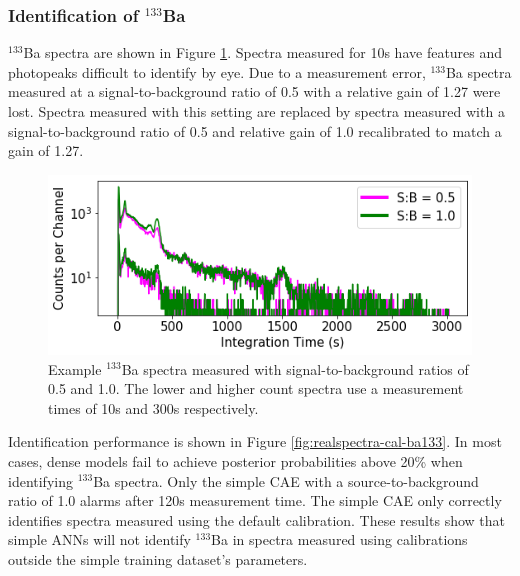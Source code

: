 \subsubsection{Identification of $^{133}$Ba}

$^{133}$Ba spectra are shown in Figure \ref{fig:realspectra-cal-ba133-spec}. Spectra measured for 10s have features and photopeaks difficult to identify by eye. Due to a measurement error, $^{133}$Ba spectra measured at a signal-to-background ratio of 0.5 with a relative gain of 1.27 were lost. Spectra measured with this setting are replaced by spectra measured with a signal-to-background ratio of 0.5 and relative gain of 1.0 recalibrated to match a gain of 1.27.

\begin{figure}[H]
	\centering
	\includegraphics[width=0.85\linewidth]{images/realspectra-cal-ba133-spec}
	\caption{Example $^{133}$Ba spectra measured with signal-to-background ratios of 0.5 and 1.0. The lower and higher count spectra use a measurement times of 10s and 300s respectively.}
	\label{fig:realspectra-cal-ba133-spec}
\end{figure}

Identification performance is shown in Figure \ref{fig:realspectra-cal-ba133}. In most cases, dense models fail to achieve posterior probabilities above 20\% when identifying $^{133}$Ba spectra. Only the simple CAE with a source-to-background ratio of 1.0 alarms after 120s measurement time. The simple CAE only correctly identifies spectra measured using the default calibration. These results show that simple ANNs will not identify $^{133}$Ba in spectra measured using calibrations outside the simple training dataset's parameters. 

